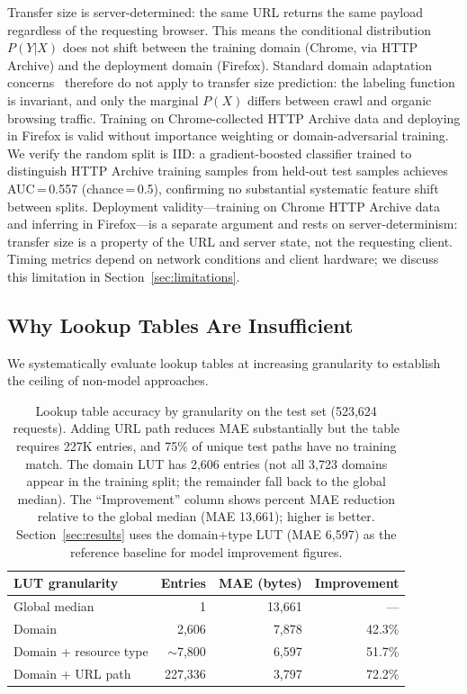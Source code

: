 \documentclass[sigconf,nonacm]{acmart}
\newcommand{\numdomains}{3{,}723\xspace}
\newcommand{\numtestrows}{523{,}624\xspace}
\begin{document}
Transfer size is server-determined: the same URL returns the same payload regardless of the requesting browser.
This means the conditional distribution $P(Y|X)$ does not shift between the training domain (Chrome, via HTTP Archive) and the deployment domain (Firefox).
Standard domain adaptation concerns~\cite{bendavid2010domain} therefore do not apply to transfer size prediction: the labeling function is invariant, and only the marginal $P(X)$ differs between crawl and organic browsing traffic.
Training on Chrome-collected HTTP Archive data and deploying in Firefox is valid without importance weighting or domain-adversarial training.
We verify the random split is IID: a gradient-boosted classifier trained to distinguish HTTP Archive training samples from held-out test samples achieves AUC\,=\,0.557 (chance\,=\,0.5), confirming no substantial systematic feature shift between splits. Deployment validity---training on Chrome HTTP Archive data and inferring in Firefox---is a separate argument and rests on server-determinism: transfer size is a property of the URL and server state, not the requesting client.
Timing metrics depend on network conditions and client hardware; we discuss this limitation in Section~\ref{sec:limitations}.

\subsection{Why Lookup Tables Are Insufficient}
\label{sec:lut-motivation}

We systematically evaluate lookup tables at increasing granularity to establish the ceiling of non-model approaches.

\begin{table}[t]
\centering
\small
\begin{tabular}{lrrr}
\toprule
LUT granularity & Entries & MAE (bytes) & Improvement \\
\midrule
Global median & 1 & 13,661 & --- \\
Domain & 2,606 & 7,878 & 42.3\% \\
Domain + resource type & $\sim$7,800 & 6,597 & 51.7\% \\
Domain + URL path & 227,336 & 3,797 & 72.2\% \\
\bottomrule
\end{tabular}
\caption{Lookup table accuracy by granularity on the test set (\numtestrows requests). Adding URL path reduces MAE substantially but the table requires 227K entries, and 75\% of unique test paths have no training match. The domain LUT has 2,606 entries (not all \numdomains domains appear in the training split; the remainder fall back to the global median). The ``Improvement'' column shows percent MAE reduction relative to the global median (MAE 13{,}661); higher is better. Section~\ref{sec:results} uses the domain+type LUT (MAE 6{,}597) as the reference baseline for model improvement figures.}
\label{tab:lut-hierarchy}
\end{table}
\end{document}
